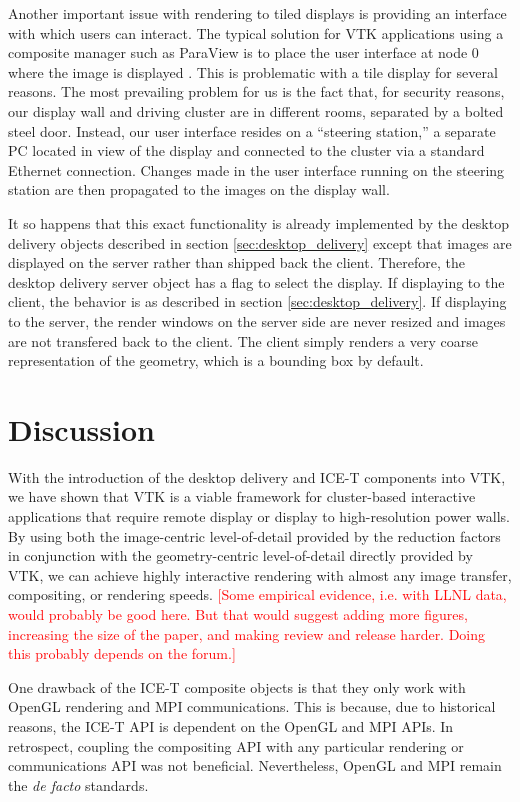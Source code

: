\documentclass[twocolumn]{article}
\newcommand{\sticky}[1]{\textcolor{Red}{[#1]}}
\begin{document}
Another important issue with rendering to tiled displays is providing an
interface with which users can interact.  The typical solution for VTK
applications using a composite manager such as ParaView is to place the
user interface at node 0 where the image is displayed \cite{Law01}.  This
is problematic with a tile display for several reasons.  The most
prevailing problem for us is the fact that, for security reasons, our
display wall and driving cluster are in different rooms, separated by a
bolted steel door.  Instead, our user interface resides on a ``steering
station,'' a separate PC located in view of the display and connected to
the cluster via a standard Ethernet connection.  Changes made in the user
interface running on the steering station are then propagated to the images
on the display wall.

It so happens that this exact functionality is already implemented by the
desktop delivery objects described in section \ref{sec:desktop_delivery}
except that images are displayed on the server rather than shipped back the
client.  Therefore, the desktop delivery server object has a flag to select
the display.  If displaying to the client, the behavior is as described in
section \ref{sec:desktop_delivery}.  If displaying to the server, the
render windows on the server side are never resized and images are not
transfered back to the client.  The client simply renders a very coarse
representation of the geometry, which is a bounding box by default.


\section{Discussion}
\label{sec:discussion}

With the introduction of the desktop delivery and ICE-T components into
VTK, we have shown that VTK is a viable framework for cluster-based
interactive applications that require remote display or display to
high-resolution power walls.  By using both the image-centric
level-of-detail provided by the reduction factors in conjunction with the
geometry-centric level-of-detail directly provided by VTK, we can achieve
highly interactive rendering with almost any image transfer, compositing,
or rendering speeds.  \sticky{Some empirical evidence, i.e. with LLNL data,
would probably be good here.  But that would suggest adding more figures,
increasing the size of the paper, and making review and release harder.
Doing this probably depends on the forum.}

One drawback of the ICE-T composite objects is that they only work with
OpenGL rendering and MPI communications.  This is because, due to
historical reasons, the ICE-T API is dependent on the OpenGL and MPI APIs.
In retrospect, coupling the compositing API with any particular rendering
or communications API was not beneficial.  Nevertheless, OpenGL and MPI
remain the \emph{de facto} standards.
\end{document}
